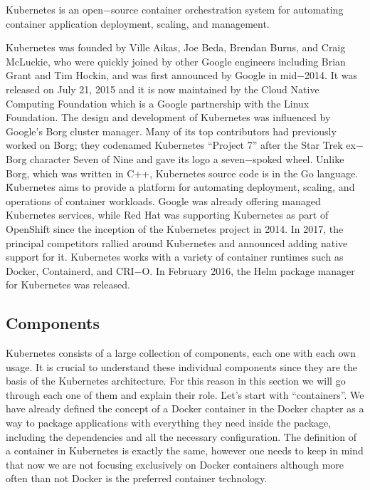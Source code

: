 \bd[Kubernetes]
Kubernetes is an open$-$source container orchestration system for automating container application deployment, scaling,
and management.
\ed

Kubernetes was founded by Ville Aikas, Joe Beda, Brendan Burns, and Craig McLuckie, who were quickly joined by other
Google engineers including Brian Grant and Tim Hockin, and was first announced by Google in mid$-$2014. It was
released on July 21, 2015 and it is now maintained by the Cloud Native Computing Foundation which is a Google
partnership with the Linux Foundation. The design and development of Kubernetes was influenced by Google's Borg
cluster manager. Many of its top contributors had previously worked on Borg; they codenamed Kubernetes ``Project 7''
after the Star Trek ex$-$Borg character Seven of Nine and gave its logo a seven$-$spoked wheel. Unlike Borg, which
was written in C++, Kubernetes source code is in the Go language. \v

Kubernetes aims to provide a platform for automating deployment, scaling, and operations of container workloads.
Google was already offering managed Kubernetes services, while Red Hat was supporting Kubernetes as part of OpenShift
since the inception of the Kubernetes project in 2014. In 2017, the principal competitors rallied around Kubernetes
and announced adding native support for it. Kubernetes works with a variety of container runtimes such as Docker,
Containerd, and CRI$-$O. In February 2016, the Helm package manager for Kubernetes was released.

\subsection{Components}

Kubernetes consists of a large collection of components, each one with each own usage. It is crucial to understand
these individual components since they are the basis of the Kubernetes architecture. For this reason in this section
we will go through each one of them and explain their role. \v

Let's start with ``containers''. We have already defined the concept of a Docker container in the Docker chapter as a
way to package applications with everything they need inside the package, including the dependencies and all the
necessary configuration. The definition of a container in Kubernetes is exactly the same, however one needs to keep
in mind that now we are not focusing exclusively on Docker containers although more often than not Docker is the
preferred container technology.

